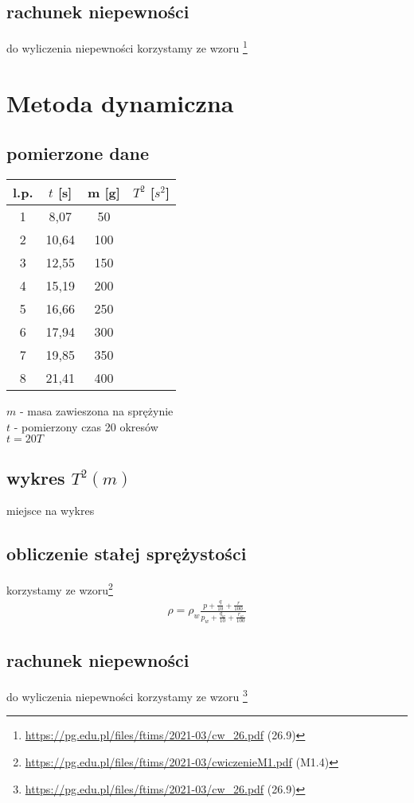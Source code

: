 \documentclass{article}
\begin{document}
\subsection{rachunek niepewności}
do wyliczenia niepewności korzystamy ze wzoru \footnote{\url{https://pg.edu.pl/files/ftims/2021-03/cw_26.pdf} (26.9)}

\section{Metoda dynamiczna}
\subsection{pomierzone dane}
\begin{center}
\begin{tabular}{ c | c | c| c }
l.p. & $t$ [s] & m [g]  & $T^2$ [$s^2$]\\
\hline
 1 & 8,07  & 50\\ 
 2 & 10,64  & 100\\ 
 3 & 12,55  & 150\\ 
 4 & 15,19 & 200 \\
 5 & 16,66 & 250 \\
 6 & 17,94 & 300 \\
 7 & 19,85 & 350 \\
 8 & 21,41 & 400 \\

\end{tabular}
\end{center}
$m$ - masa zawieszona na sprężynie \\
$t$ - pomierzony czas 20 okresów \\
$t = 20T$

\subsection{wykres $T^2(m)$}
miejsce na wykres

\subsection{obliczenie stałej sprężystości}
korzystamy ze wzoru\footnote{\url{https://pg.edu.pl/files/ftims/2021-03/cwiczenieM1.pdf} (M1.4)}
\begin{gather*}
	\rho = \rho_w \frac{p+\frac{q}{10} + \frac{r}{100}}{p_w+\frac{q_w}{10} + \frac{r_w}{100}}
\end{gather*} 

\subsection{rachunek niepewności}
do wyliczenia niepewności korzystamy ze wzoru \footnote{\url{https://pg.edu.pl/files/ftims/2021-03/cw_26.pdf} (26.9)}
\end{document}
